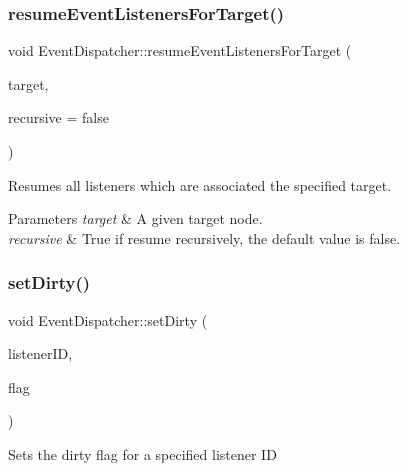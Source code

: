 \subsubsection{\texorpdfstring{resume\+Event\+Listeners\+For\+Target()}{resumeEventListenersForTarget()}\hspace{0.1cm}{\footnotesize\ttfamily [2/2]}}
{\footnotesize\ttfamily void Event\+Dispatcher\+::resume\+Event\+Listeners\+For\+Target (\begin{DoxyParamCaption}\item[{\hyperlink{classNode}{Node} $\ast$}]{target,  }\item[{bool}]{recursive = {\ttfamily false} }\end{DoxyParamCaption})}

Resumes all listeners which are associated the specified target.


\begin{DoxyParams}{Parameters}
{\em target} & A given target node. \\
\hline
{\em recursive} & True if resume recursively, the default value is false. \\
\hline
\end{DoxyParams}
\mbox{\label{classEventDispatcher_aacdc31196bd0b1881d4e2b807134882f}} 
\subsubsection{\texorpdfstring{set\+Dirty()}{setDirty()}\hspace{0.1cm}{\footnotesize\ttfamily [1/2]}}
{\footnotesize\ttfamily void Event\+Dispatcher\+::set\+Dirty (\begin{DoxyParamCaption}\item[{const Event\+Listener\+::\+Listener\+ID \&}]{listener\+ID,  }\item[{\hyperlink{classEventDispatcher_a05d949544dae4e41a1ba912ab962db33}{Dirty\+Flag}}]{flag }\end{DoxyParamCaption})\hspace{0.3cm}{\ttfamily [protected]}}

Sets the dirty flag for a specified listener ID \mbox{\label{classEventDispatcher_aacdc31196bd0b1881d4e2b807134882f}} 
